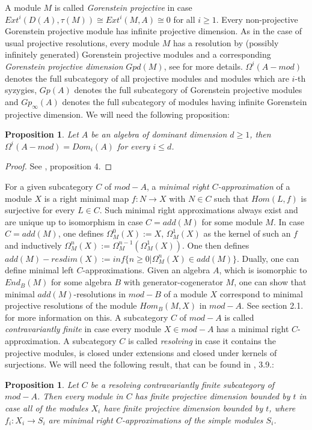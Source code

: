 \documentclass[a4paper]{amsart}
\newtheorem{proposition}[theorem]{Proposition}
\theoremstyle{definition}
\theoremstyle{remark}
\numberwithin{equation}{theorem}
\begin{document}
A module $M$ is called \emph{Gorenstein projective} in case $Ext^{i}(D(A),\tau(M)) \cong Ext^{i}(M,A) \cong 0$ for all $i \geq 1$. Every non-projective Gorenstein projective module has infinite projective dimension. As in the case of usual projective resolutions, every module $M$ has a resolution by (possibly infinitely generated) Gorenstein projective modules and a corresponding \emph{Gorenstein projective dimension} $Gpd(M)$, see \cite{Che} for more details. $\Omega^{i}(A-mod)$ denotes the full subcategory of all projective modules and modules which are $i$-th syzygies, $Gp(A)$ denotes the full subcategory of Gorenstein projective modules and $Gp_{\infty}(A)$ denotes the full subcategory of modules having infinite Gorenstein projective dimension. 
We will need the following proposition:
\begin{proposition}\label{marvil}
Let $A$ be an algebra of dominant dimension $d \geq 1$, then $\Omega^{i}(A-mod)=Dom_i(A)$ for every $i \leq d$.
\end{proposition}
\begin{proof}
See \cite{MarVil}, proposition 4.
\end{proof}
For a given subcategory $C$ of $mod-A$, a \emph{minimal right $C$-approximation} of a module $X$ is a right minimal map $f: N \rightarrow X$ with $N \in C$ such that $Hom(L,f)$ is surjective for every $L \in C$. Such minimal right approximations always exist and are unique up to isomorphism in case $C=add(M)$ for some module $M$. In case $C=add(M)$, one defines $\Omega_M^{0}(X):=X$, $\Omega_M^{1}(X)$ as the kernel of such an $f$ and inductively $\Omega_M^{n}(X):=\Omega_M^{n-1}(\Omega_M^{1}(X))$. One then defines $add(M)-resdim(X):= inf \{ n \geq 0 | \Omega_M^{n}(X) \in add(M) \}$. Dually, one can define minimal left $C$-approximations. Given an algebra $A$, which is isomorphic to $End_B(M)$ for some algebra $B$ with generator-cogenerator $M$, one can show that minimal $add(M)$-resolutions in $mod-B$ of a module $X$ correspond to minimal projective resolutions of the module $Hom_B(M,X)$ in $mod-A$. See \cite{CheKoe} section 2.1. for more information on this.
A subcategory $C$ of $mod-A$ is called \emph{contravariantly finite} in case every module $X \in mod-A$ has a minimal right $C$-approximation. A subcategory $C$ is called \emph{resolving} in case it contains the projective modules, is closed under extensions and closed under kernels of surjections. 
We will need the following result, that can be found in \cite{AR}, 3.9.:
\begin{proposition}\label{ARpropo}
Let $C$ be a resolving contravariantly finite subcategory of $mod-A$. Then every module in $C$ has finite projective dimension bounded by $t$ in case all of the modules $X_i$ have finite projective dimension bounded by $t$, where $f_i: X_i \rightarrow S_i$ are minimal right $C$-approximations of the simple modules $S_i$.
\end{proposition} 
\end{document}
